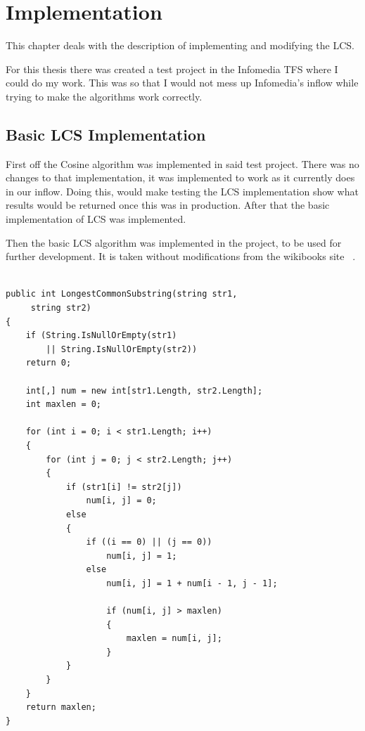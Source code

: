 \chapter{Implementation}

This chapter deals with the description of implementing and modifying the LCS.

For this thesis there was created a test project in the Infomedia TFS where I could do my work. This was so that I would not mess up Infomedia's inflow while trying to make the algorithms work correctly.

\section{Basic LCS Implementation}
First off the Cosine algorithm was implemented in said test project. There was no changes to that implementation,  it was implemented to work as it currently does in our inflow. Doing this, would make testing the LCS implementation show what results would be returned once this was in production. After that the basic implementation of LCS was implemented.

Then the basic LCS algorithm was implemented in the project, to be used for further development. It is taken without modifications from the wikibooks site ~\cite{WikiLCS}.

\lstset{style=sharpc}
\begin{lstlisting}[caption=Basic LCS implementation in C$^\sharp$, captionpos=b]

public int LongestCommonSubstring(string str1,
	 string str2)
{
    if (String.IsNullOrEmpty(str1) 
    	|| String.IsNullOrEmpty(str2))
    return 0;
	
	int[,] num = new int[str1.Length, str2.Length];
	int maxlen = 0;

    for (int i = 0; i < str1.Length; i++)
  	{
    	for (int j = 0; j < str2.Length; j++)
        {
        	if (str1[i] != str2[j])
            	num[i, j] = 0;
            else
            {
            	if ((i == 0) || (j == 0))
                	num[i, j] = 1;
                else
                    num[i, j] = 1 + num[i - 1, j - 1];

                    if (num[i, j] > maxlen)
                    {
                    	maxlen = num[i, j];
                  	}
           	}
     	}
	}
    return maxlen;
}

\end{lstlisting}

